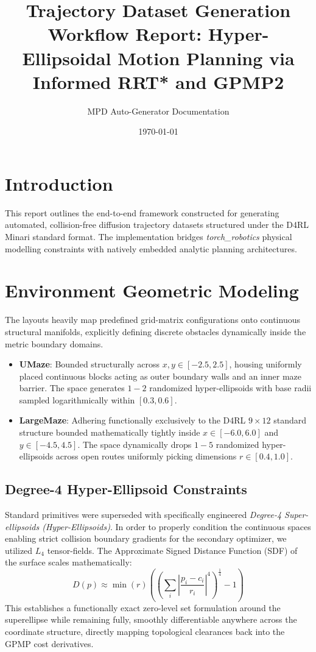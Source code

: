 \documentclass[11pt]{article}
\title{Trajectory Dataset Generation Workflow Report: Hyper-Ellipsoidal Motion Planning via Informed RRT* and GPMP2}
\author{MPD Auto-Generator Documentation}
\date{\today}
\begin{document}
\maketitle

\section{Introduction}
This report outlines the end-to-end framework constructed for generating automated, collision-free diffusion trajectory datasets structured under the D4RL Minari standard format. The implementation bridges \textit{torch\_robotics} physical modelling constraints with natively embedded analytic planning architectures.

\section{Environment Geometric Modeling}
The layouts heavily map predefined grid-matrix configurations onto continuous structural manifolds, explicitly defining discrete obstacles dynamically inside the metric boundary domains.
\begin{itemize}[leftmargin=*]
    \item \textbf{UMaze}: Bounded structurally across $x,y \in [-2.5, 2.5]$, housing uniformly placed continuous blocks acting as outer boundary walls and an inner maze barrier. The space generates $1-2$ randomized hyper-ellipsoids with base radii sampled logarithmically within $[0.3, 0.6]$.
    \item \textbf{LargeMaze}: Adhering functionally exclusively to the D4RL $9 \times 12$ standard structure bounded mathematically tightly inside $x \in [-6.0, 6.0]$ and $y \in [-4.5, 4.5]$. The space dynamically drops $1-5$ randomized hyper-ellipsoids across open routes uniformly picking dimensions $r \in [0.4, 1.0]$.
\end{itemize}

\subsection{Degree-4 Hyper-Ellipsoid Constraints}
Standard primitives were superseded with specifically engineered \textit{Degree-4 Super-ellipsoids (Hyper-Ellipsoids)}. In order to properly condition the continuous spaces enabling strict collision boundary gradients for the secondary optimizer, we utilized $L_4$ tensor-fields. The Approximate Signed Distance Function (SDF) of the surface scales mathematically:
\begin{equation}
D(p) \approx \min(r) \left( \left( \sum_{i} \left| \frac{p_i - c_i}{r_i} \right|^4 \right)^{\frac{1}{4}} - 1 \right)
\end{equation}
This establishes a functionally exact zero-level set formulation around the superellipse while remaining fully, smoothly differentiable anywhere across the coordinate structure, directly mapping topological clearances back into the GPMP cost derivatives.
\end{document}
